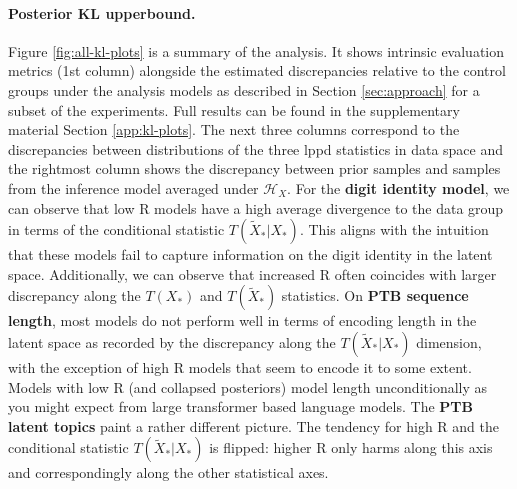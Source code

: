 
\paragraph{Posterior KL upperbound.} Figure \ref{fig:all-kl-plots} is a summary of the analysis. It shows intrinsic evaluation metrics (1st column) alongside the estimated discrepancies relative to the control groups under the analysis models as described in Section \ref{sec:approach} for a subset of the experiments. Full results can be found in the supplementary material Section \ref{app:kl-plots}. The next three columns correspond to the discrepancies between distributions of the three lppd statistics in data space and the rightmost column shows the discrepancy between prior samples and samples from the inference model averaged under $\mathcal H_X$.
For the {\bf digit identity model}, we can observe that low R models have a high average divergence to the data group in terms of the conditional statistic $T(\tilde X_*|X_*)$. This aligns with the intuition that these models fail to capture information on the digit identity in the latent space. Additionally, we can observe that increased R often coincides with larger discrepancy along the $T(X_*)$ and $T(\tilde X_*)$ statistics. 
On {\bf PTB sequence length}, most models do not perform well in terms of encoding length in the latent space as recorded by the discrepancy along the $T(\tilde X_*|X_*)$ dimension, with the exception of high R models that seem to encode it to some extent. Models with low R (and collapsed posteriors) model length unconditionally as you might expect from large transformer based language models. 
The {\bf PTB latent topics} paint a rather different picture. The tendency for high R and the conditional statistic $T(\tilde X_*|X_*)$ is flipped: higher R only harms along this axis and correspondingly along the other statistical axes. 


